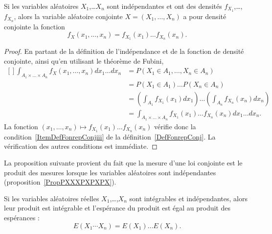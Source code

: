 \begin{proposition}     \label{PropDensiteConjIndep}
    Si les variables aléatoires \( X_1\),\ldots \( X_n\) sont indépendantes et ont des densités \( f_{X_1}\),\ldots,\( f_{X_n}\), alors la variable aléatoire conjointe \( X=(X_1,\ldots,X_n)\) a pour densité conjointe la fonction
    \begin{equation}
        f_X(x_1,\ldots,x_n)=f_{X_1}(x_1)\ldots f_{X_n}(x_n).
    \end{equation}
\end{proposition}

\begin{proof}
    En partant de la définition de l'indépendance et de la fonction de densité conjointe, ainsi qu'en utilisant le théorème de Fubini,
    \begin{equation}
        \begin{aligned}[]
            \int_{A_1\times \ldots\times A_n}f_X(x_1,\ldots,x_n)dx_1\ldots dx_n&=
            P(X_1\in A_1,\ldots,X_n\in A_n)\\
            &=P(X_1\in A_1)\ldots P(X_n\in A_n)\\
            &=\left( \int_{A_1}f_{X_1}(x_1)dx_1 \right)\ldots\left( \int_{A_n}f_{X_n}(x_n)dx_n \right)\\
            &=\int_{A_1\times\ldots\times A_n}f_{X_1}(x_1)\ldots f_{X_n}(x_n)dx_1\ldots dx_n.
        \end{aligned}
    \end{equation}
    La fonction \( (x_1,\ldots,x_n)\mapsto f_{X_1}(x_1)\ldots f_{X_n}(x_n)\) vérifie donc la condition~\ref{ItemDefFonrepConjiii} de la définition~\ref{DefFonrepConj}. La vérification des autres conditions est immédiate.
\end{proof}


La proposition suivante provient du fait que la mesure d'une loi conjointe est le produit des mesures lorsque les variables aléatoires sont indépendantes (proposition~\ref{PropPXXXPXPXPX}).
\begin{proposition}
    Si les variables aléatoires réelles \( X_1\),\ldots,\( X_n\) sont intégrables et indépendantes, alors leur produit est intégrable et l'espérance du produit est égal au produit des espérances :
    \begin{equation}
        E(X_1\cdots X_n)=E(X_1)\ldots E(X_n).
    \end{equation}
\end{proposition}

